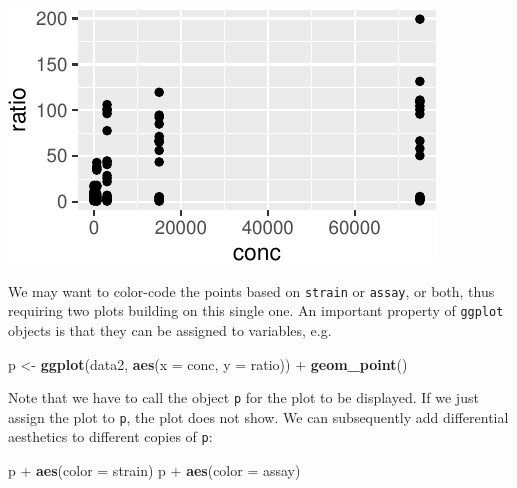 \documentclass[]{book}
\newenvironment{Shaded}{}{}
\newcommand{\DataTypeTok}[1]{\textcolor[rgb]{0.56,0.13,0.00}{#1}}
\newcommand{\KeywordTok}[1]{\textcolor[rgb]{0.00,0.44,0.13}{\textbf{#1}}}
\newcommand{\NormalTok}[1]{#1}
\newcommand{\OperatorTok}[1]{\textcolor[rgb]{0.40,0.40,0.40}{#1}}
\newcommand{\StringTok}[1]{\textcolor[rgb]{0.25,0.44,0.63}{#1}}
\begin{document}
\begin{center}\includegraphics[width=\textwidth]{TRES-Tidy-Tutorial_files/figure-latex/unnamed-chunk-119-1} \end{center}

We may want to color-code the points based on \texttt{strain} or \texttt{assay}, or both, thus requiring two plots building on this single one. An important property of \texttt{ggplot} objects is that they can be assigned to variables, e.g.

\begin{Shaded}
\begin{Highlighting}[]
\NormalTok{p <-}\StringTok{ }\KeywordTok{ggplot}\NormalTok{(data2, }\KeywordTok{aes}\NormalTok{(}\DataTypeTok{x =}\NormalTok{ conc, }\DataTypeTok{y =}\NormalTok{ ratio)) }\OperatorTok{+}
\StringTok{  }\KeywordTok{geom_point}\NormalTok{()}
\end{Highlighting}
\end{Shaded}

Note that we have to call the object \texttt{p} for the plot to be displayed. If we just assign the plot to \texttt{p}, the plot does not show. We can subsequently add differential aesthetics to different copies of \texttt{p}:

\begin{Shaded}
\begin{Highlighting}[]
\NormalTok{p }\OperatorTok{+}\StringTok{ }\KeywordTok{aes}\NormalTok{(}\DataTypeTok{color =}\NormalTok{ strain)}
\NormalTok{p }\OperatorTok{+}\StringTok{ }\KeywordTok{aes}\NormalTok{(}\DataTypeTok{color =}\NormalTok{ assay)}
\end{Highlighting}
\end{Shaded}
\end{document}
